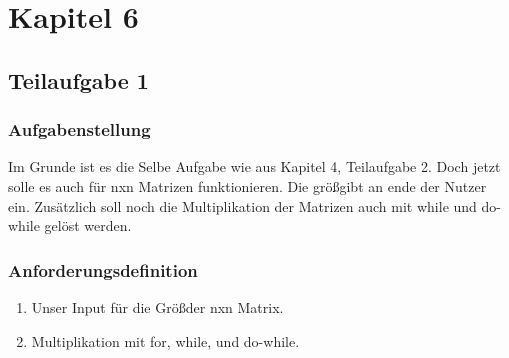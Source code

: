 \section{Kapitel 6}
\subsection{Teilaufgabe 1}
\subsubsection{Aufgabenstellung}
Im Grunde ist es die Selbe Aufgabe wie aus Kapitel 4, Teilaufgabe 2. Doch jetzt solle es auch
für nxn Matrizen funktionieren. Die grö\ss\space gibt an ende der Nutzer ein. Zusätzlich soll
noch die Multiplikation der Matrizen auch mit while und do-while gelöst werden.

\subsubsection{Anforderungsdefinition}
\begin{enumerate}
	\item Unser Input für die Grö\ss\space der nxn Matrix.
	\item Multiplikation mit for, while, und do-while.
\end{enumerate}

